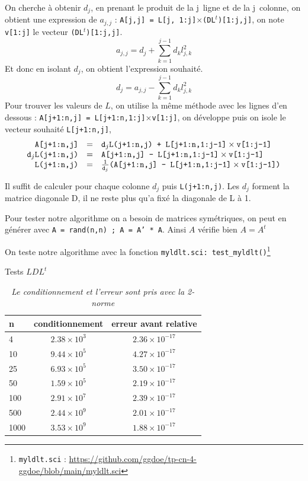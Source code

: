 \documentclass{article}
\begin{document}
On cherche à obtenir $d_j$, en prenant le produit de la j\ieme\ ligne et de la j\ieme\  colonne, on obtient une expression de $a_{j,j}$ :
\texttt{A[j,j] = L[j, 1:j]$\times$(DL$^t$)[1:j,j]}, on note \texttt{v[1:j]} le vecteur \texttt{(DL$^t$)[1:j,j]}.
\[
a_{j,j} = d_j + \sum_{k=1}^{j-1} d_k l^2_{j,k}
\]
Et donc en isolant $d_j$, on obtient l'expression souhaité.
\[
d_j = a_{j,j} - \sum_{k=1}^{j-1} d_k l^2_{j,k}
\]
Pour trouver les valeurs de \(L\), on utilise la même méthode avec les lignes d'en dessous : \texttt{A[j+1:n,j] = L[j+1:n,1:j]$\times$v[1:j]}, on développe puis on isole le vecteur souhaité \texttt{L[j+1:n,j]},
\[
	\begin{array}{r c l}
	\texttt{A[j+1:n,j]} & = & \texttt{d}_j\texttt{L(j+1:n,j) + L[j+1:n,1:j-1]}\times \texttt{v[1:j-1]} \\
	\texttt{d}_j\texttt{L(j+1:n,j)} & = & \texttt{A[j+1:n,j] - L[j+1:n,1:j-1]}\times \texttt{v[1:j-1]}\\
	\texttt{L(j+1:n,j)} & = & \frac{1}{\texttt{d}_j}\texttt{(A[j+1:n,j] - L[j+1:n,1:j-1]}\times \texttt{v[1:j-1])} \\
	\end{array}
\]

Il suffit de calculer pour chaque colonne $d_j$ puis \texttt{L(j+1:n,j)}. Les $d_j$ forment la matrice diagonale D, il ne reste plus qu'a fixé la diagonale de L à 1.

Pour tester notre algorithme on a besoin de matrices symétriques, on peut en générer avec \texttt{A = rand(n,n) ; A = A' * A}.
Ainsi \(A\) vérifie bien \(A = A^t\)
\newline\indent

On teste notre algorithme avec la fonction \texttt{myldlt.sci: test\_myldlt()}\footnote{\texttt{myldlt.sci} : \href{https://github.com/ggdoe/tp-cn-4-ggdoe/blob/main/myldlt.sci}{https://github.com/ggdoe/tp-cn-4-ggdoe/blob/main/myldlt.sci}}

\begin{table}[H]
\renewcommand*\arraystretch{1.3}
\begin{center}
\caption{Tests \(LDL^t\)}
\begin{tabular}{|l|c|c|}
  \hline
  n & conditionnement & erreur avant relative \\
  \hline
	4	& \(2.38 \times 10^3\)	& \(2.36 \times 10^{-17}\) \\
	10	& \(9.44 \times 10^5\)	& \(4.27 \times 10^{-17}\) \\
	25	& \(6.93 \times 10^5\)	& \(3.50 \times 10^{-17}\) \\
	50	& \(1.59 \times 10^5\)	& \(2.19 \times 10^{-17}\) \\
	100	& \(2.91 \times 10^7\)	& \(2.39 \times 10^{-17}\) \\
	500	& \(2.44 \times 10^9\)	& \(2.01 \times 10^{-17}\) \\
	1000& \(3.53 \times 10^9\)	& \(1.88 \times 10^{-17}\) \\
  \hline
\end{tabular}
\caption*{\textit{Le conditionnement et l'erreur sont pris avec la 2-norme}}
\end{center}
\end{table}
\end{document}
